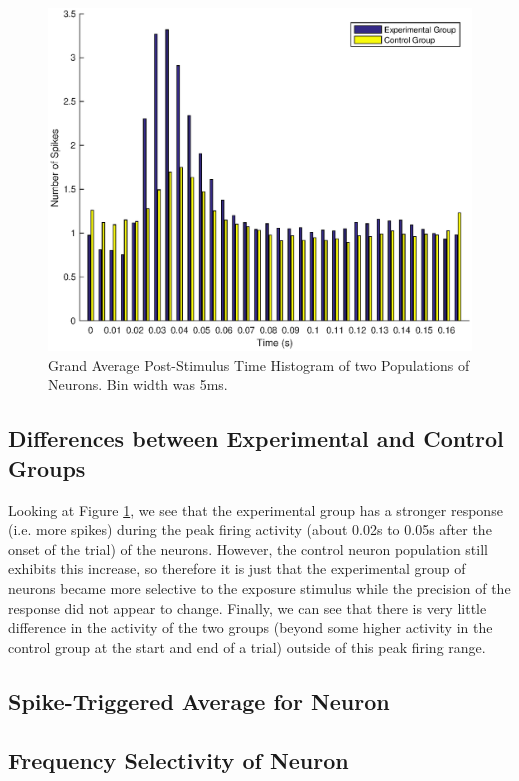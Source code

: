 \documentclass[11pt, oneside]{article}
\begin{document}
\begin{figure}[ht!]
\includegraphics[width=1\textwidth]{Q1PD.eps}
\caption{Grand Average Post-Stimulus Time Histogram of two Populations of Neurons. Bin width was 5ms.}
\label{fig:PSTH}
\end{figure}

\subsection{Differences between Experimental and Control Groups}

Looking at Figure \ref{fig:PSTH}, we see that the experimental group has a stronger response (i.e. more spikes)
during the peak firing activity (about 0.02s to 0.05s after the onset of the trial) of the neurons. However, the control neuron population still exhibits this increase, so therefore it is just that the experimental group of neurons became more selective to the exposure stimulus while the precision of the response did not appear to change. Finally, we can see that there is very little difference in the activity of the two groups (beyond some higher activity in the control group at the start and end of a trial) outside of this peak firing range.

\subsection{Spike-Triggered Average for Neuron}

\subsection{Frequency Selectivity of Neuron}
\end{document}
